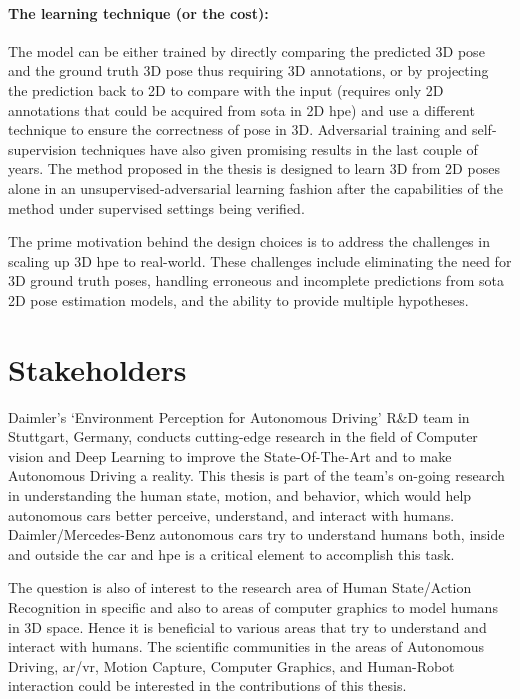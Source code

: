 \paragraph{The learning technique (or the cost):} The model can be either trained by directly comparing the predicted 3D pose and the ground truth 3D pose thus requiring 3D annotations, or by projecting the prediction back to 2D to compare with the input (requires only 2D annotations that could be acquired from \ac{sota} in 2D \ac{hpe}) and use a different technique to ensure the correctness of pose in 3D. Adversarial training and self-supervision techniques have also given promising results in the last couple of years. The method proposed in the thesis is designed to learn 3D from 2D poses alone in an unsupervised-adversarial learning fashion after the capabilities of the method under supervised settings being verified.

The prime motivation behind the design choices is to address the challenges in scaling up 3D \ac{hpe} to real-world. These challenges include eliminating the need for 3D ground truth poses, handling erroneous and incomplete predictions from \ac{sota} 2D pose estimation models, and the ability to provide multiple hypotheses.

\section{Stakeholders}
\label{sec:stakeholders}
Daimler’s ‘Environment Perception for Autonomous Driving’ R\&D team in Stuttgart, Germany, conducts cutting-edge research in the field of Computer vision and Deep Learning to improve the State-Of-The-Art and to make Autonomous Driving a reality. This thesis is part of the team’s on-going research in understanding the human state, motion, and behavior, which would help autonomous cars better perceive, understand, and interact with humans. Daimler/Mercedes-Benz autonomous cars try to understand humans both, inside and outside the car and \ac{hpe} is a critical element to accomplish this task.

The question is also of interest to the research area of Human State/Action Recognition in specific and also to areas of computer graphics to model humans in 3D space. Hence it is beneficial to various areas that try to understand and interact with humans. The scientific communities in the areas of Autonomous Driving, \ac{ar/vr}, Motion Capture, Computer Graphics, and Human-Robot interaction could be interested in the contributions of this thesis.

